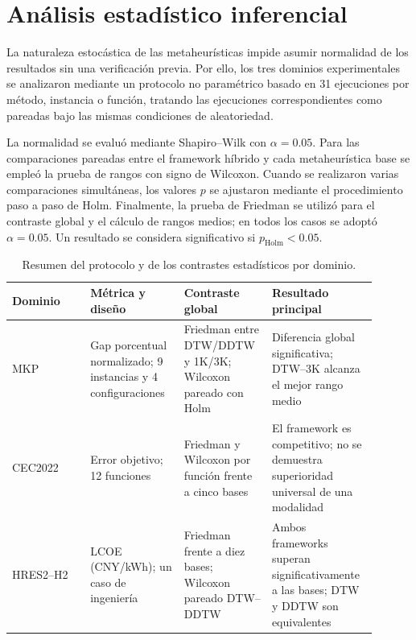%   

\section{An\'alisis estad\'istico inferencial}
\label{sec:analisis-estadistico-global}

La naturaleza estoc\'astica de las metaheur\'isticas impide asumir normalidad de los resultados sin una verificaci\'on previa. Por ello, los tres dominios experimentales se analizaron mediante un protocolo no param\'etrico basado en 31 ejecuciones por m\'etodo, instancia o funci\'on, tratando las ejecuciones correspondientes como pareadas bajo las mismas condiciones de aleatoriedad.

La normalidad se evalu\'o mediante Shapiro--Wilk con $\alpha=0.05$. Para las
comparaciones pareadas entre el framework h\'ibrido y cada metaheur\'istica
base se emple\'o la prueba de rangos con signo de Wilcoxon. Cuando se realizaron
varias comparaciones simult\'aneas, los valores $p$ se ajustaron mediante el
procedimiento paso a paso de Holm. Finalmente, la prueba de Friedman se utiliz\'o
para el contraste global y el c\'alculo de rangos medios; en todos los casos se
adopt\'o $\alpha=0.05$. Un resultado se considera significativo si
$p_{\mathrm{Holm}}<0.05$.

\begin{table}[htbp]
\centering
\caption{Resumen del protocolo y de los contrastes estad\'isticos por dominio.}
\label{tab:resumen-contrastes-estadisticos}
\small
\begin{tabular}{p{0.20\linewidth}p{0.24\linewidth}p{0.22\linewidth}p{0.24\linewidth}}
\toprule
Dominio & M\'etrica y dise\~no & Contraste global & Resultado principal \\
\midrule
MKP & Gap porcentual normalizado; 9 instancias y 4 configuraciones & Friedman entre DTW/DDTW y 1K/3K; Wilcoxon pareado con Holm & Diferencia global significativa; DTW--3K alcanza el mejor rango medio \\
CEC2022 & Error objetivo; 12 funciones & Friedman y Wilcoxon por funci\'on frente a cinco bases & El framework es competitivo; no se demuestra superioridad universal de una modalidad \\
HRES2--H2 & LCOE (CNY/kWh); un caso de ingenier\'ia & Friedman frente a diez bases; Wilcoxon pareado DTW--DDTW & Ambos frameworks superan significativamente a las bases; DTW y DDTW son equivalentes \\
\bottomrule
\end{tabular}
\end{table}

